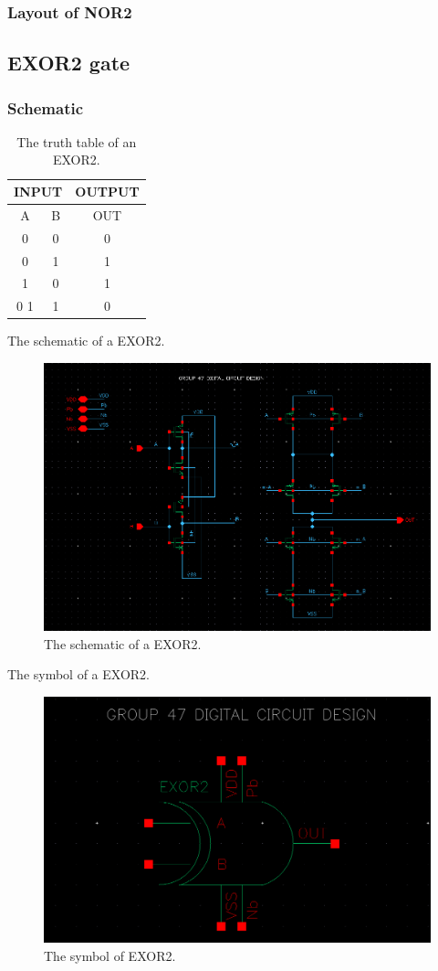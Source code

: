 \subsubsection{Layout of NOR2}

\subsection{EXOR2 gate}

\subsubsection{Schematic}

\begin{table}[H]
	\centering
	\begin{tabular}{|c|c|c|}
		\hline
		\multicolumn{2}{|c|}{INPUT} & OUTPUT \\
		\hline
		A & B  & OUT\\
		\hline
		0 & 0 & 0 \\
		\hline
		0 & 1 & 1\\
		\hline
		1 & 0 & 1\\
		\hline0
		1 & 1 & 0\\
		\hline
	\end{tabular}
	\caption{The truth table of an EXOR2.}
	\label{t_the truth table of EXOR2}
\end{table}

The schematic of a EXOR2.

\begin{figure}[H]
	\centering
	\includegraphics[width=.6\linewidth]{section/EX1/EXOR/EX1_EXOR2_schematic.png}
	\caption{The schematic of a EXOR2.}
	\label{f_EX1_EXOR2_schematic}
\end{figure} 

The symbol of a EXOR2.

\begin{figure}[H]
	\centering
	\includegraphics[width=.6\linewidth]{section/EX1/EXOR/EX1_EXOR2_symbol.png}
	\caption{The symbol of EXOR2.}
	\label{f_EX1_EXOR2_symbol}
\end{figure}

